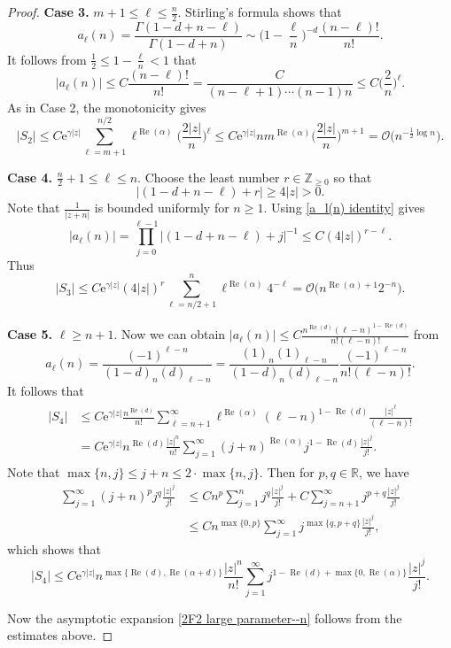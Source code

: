 \documentclass[10pt,a4paper]{amsart}
\numberwithin{equation}{section}
\newcommand{\RR}{\ensuremath{\mathbb{R}}}
\newcommand{\ZZ}{\ensuremath{\mathbb{Z}}}
\newcommand{\mo}{\mathcal{O}}
\begin{document}
\begin{proof}
	\textbf{Case 3.} $m+1\leqslant \ell\leqslant \frac{n}{2}$. Stirling's formula shows that
	\[a_\ell(n)=\frac{\Gamma(1-d+n-\ell)}{\Gamma(1-d+n)}\sim \biggl(1-\frac{\ell}{n}\biggr)^{-d}\frac{(n-\ell)!}{n!}.\]
	It follows from $\frac{1}{2}\leqslant 1-\frac{\ell}{n}<1$ that
	\[|a_\ell(n)|\leqslant C \frac{(n-\ell)!}{n!}=\frac{C}{(n-\ell+1)\cdots(n-1)n}\leqslant C\bigg(\frac{2}{n}\bigg)^{\ell}.\]
	As in Case 2, the monotonicity gives
	\[|S_2|\leqslant C\mathrm{e}^{\gamma|z|}\sum_{\ell=m+1}^{n/2}\ell^{\operatorname{Re}(\alpha)}\bigg(\frac{2|z|}{n}\bigg)^{\ell}\leqslant C\mathrm{e}^{\gamma|z|}nm^{\operatorname{Re}(\alpha)}\bigg(\frac{2|z|}{n}\bigg)^{m+1}=\mo\big(n^{-\frac{1}{2}\log n}\big).\]
	
	\textbf{Case 4.} $\frac{n}{2}+1\leqslant \ell\leqslant n$. Choose the least number $r\in\ZZ_{\geqslant 0}$ so that
	\[|(1-d+n-\ell)+r|\geqslant 4|z|>0.\]
	Note that $\frac{1}{|z+n|}$ is bounded uniformly for $n\geqslant 1$. Using \eqref{a_l(n) identity} gives
	\[|a_{\ell}(n)|=\prod_{j=0}^{\ell-1}\big|(1-d+n-\ell)+j\big|^{-1}\leqslant C(4|z|)^{r-\ell}.\]
	Thus
	\[|S_3|\leqslant C\mathrm{e}^{\gamma|z|}(4|z|)^r\sum_{\ell=n/2+1}^{n}\ell^{\operatorname{Re}(\alpha)}4^{-\ell}=\mo\big(n^{\operatorname{Re}(\alpha)+1}2^{-n}\big).\]
	
	\textbf{Case 5.} $\ell\geqslant n+1$. Now we can obtain $|a_\ell(n)|\leqslant C\frac{n^{\operatorname{Re}(d)}(\ell-n)^{1-\operatorname{Re}(d)}}{n!(\ell-n)!}$ from
	\[a_\ell(n)=\frac{(-1)^{\ell-n}}{(1-d)_n(d)_{\ell-n}}=\frac{(1)_n(1)_{\ell-n}}{(1-d)_n(d)_{\ell-n}}\frac{(-1)^{\ell-n}}{n!(\ell-n)!}.\]
	It follows that
	\begin{align*}
\begin{aligned}
		|S_4|&{} \leqslant C\mathrm{e}^{\gamma|z|}\frac{n^{\operatorname{Re}(d)}}{n!}\sum_{\ell=n+1}^{\infty}\ell^{\operatorname{Re}(\alpha)}(\ell-n)^{1-\operatorname{Re}(d)}\frac{|z|^{\ell}}{(\ell-n)!}\\
		&{} =C\mathrm{e}^{\gamma|z|}n^{\operatorname{Re}(d)}\frac{|z|^n}{n!}\sum_{j=1}^{\infty}(j+n)^{\operatorname{Re}(\alpha)}j^{1-\operatorname{Re}(d)}\frac{|z|^j}{j!}.
\end{aligned}
	\end{align*}
	Note that $\max\{n,j\}\leqslant j+n\leqslant 2\cdot\max\{n,j\}$. Then for $p,q\in\RR$, we have
	\begin{align*}
		\sum_{j=1}^{\infty}(j+n)^p j^q\frac{|z|^j}{j!}&{}\leqslant Cn^p\sum_{j=1}^{n}j^q\frac{|z|^j}{j!}+C\sum_{j=n+1}^{\infty}j^{p+q}\frac{|z|^j}{j!}\\
		&{} \leqslant Cn^{\max\{0,p\}}\sum_{j=1}^{\infty}j^{\max\{q,p+q\}}\frac{|z|^j}{j!},
	\end{align*}
	which shows that
	\[|S_4|\leqslant C\mathrm{e}^{\gamma|z|}n^{\max\{\operatorname{Re}(d),\operatorname{Re}(\alpha+d)\}}\frac{|z|^n}{n!}\sum_{j=1}^{\infty}j^{1-\operatorname{Re}(d)+\max\{0,\operatorname{Re}(\alpha)\}}\frac{|z|^j}{j!}.\]
	
	Now the asymptotic expansion \eqref{2F2 large parameter--n} follows from the estimates above.
\end{proof}
\end{document}
